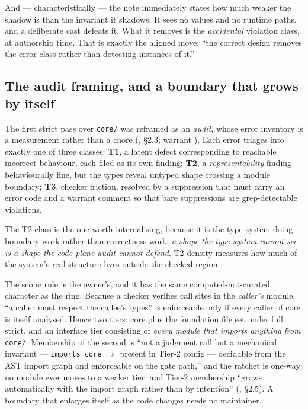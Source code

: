 And --- characteristically --- the note immediately states how much weaker the
shadow is than the invariant it shadows. It sees no values and no runtime paths,
and a deliberate cast defeats it. What it removes is the \emph{accidental}
violation class, at authorship time. That is exactly the aligned move: ``the
correct design removes the error class rather than detecting instances of it.''

\subsection*{The audit framing, and a boundary that grows by itself}

The first strict pass over \texttt{core/} was reframed as an \emph{audit}, whose
error inventory is a measurement rather than a chore
(, \S 2.3; warrant ).
Each error triages into exactly one of three classes: \textbf{T1}, a latent defect
corresponding to reachable incorrect behaviour, each filed as its own finding;
\textbf{T2}, a \emph{representability} finding --- behaviourally fine, but the
types reveal untyped shape crossing a module boundary; \textbf{T3}, checker
friction, resolved by a suppression that must carry an error code and a warrant
comment so that bare suppressions are grep-detectable violations.

The T2 class is the one worth internalising, because it is the type system doing
boundary work rather than correctness work: \emph{a shape the type system cannot
see is a shape the code-plane audit cannot defend}. T2 density measures how much of
the system's real structure lives outside the checked region.

The scope rule is the owner's, and it has the same computed-not-curated character
as the ring. Because a checker verifies call sites in the \emph{caller's} module,
``a caller must respect the callee's types'' is enforceable only if every caller of
core is itself analysed. Hence two tiers: core plus the foundation file set under
full strict, and an interface tier consisting of \emph{every module that imports
anything from} \texttt{core/}. Membership of the second is ``not a judgment call
but a mechanical invariant --- \texttt{imports core} $\Rightarrow$ present in
Tier-2 config --- decidable from the AST import graph and enforceable on the gate
path,'' and the ratchet is one-way: no module ever moves to a weaker tier, and
Tier-2 membership ``grows automatically with the import graph rather than by
intention'' (, \S 2.5). A boundary that
enlarges itself as the code changes needs no maintainer.

